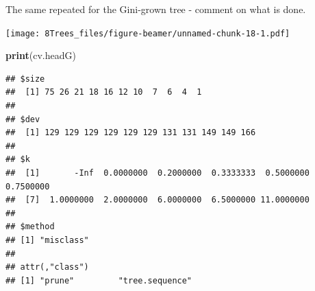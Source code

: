 \documentclass[10pt,ignorenonframetext,]{beamer}
\newenvironment{Shaded}{\begin{snugshade}}{\end{snugshade}}
\newcommand{\KeywordTok}[1]{\textcolor[rgb]{0.13,0.29,0.53}{\textbf{#1}}}
\newcommand{\DataTypeTok}[1]{\textcolor[rgb]{0.13,0.29,0.53}{#1}}
\newcommand{\DecValTok}[1]{\textcolor[rgb]{0.00,0.00,0.81}{#1}}
\newcommand{\StringTok}[1]{\textcolor[rgb]{0.31,0.60,0.02}{#1}}
\newcommand{\OperatorTok}[1]{\textcolor[rgb]{0.81,0.36,0.00}{\textbf{#1}}}
\newcommand{\NormalTok}[1]{#1}
\begin{document}
\begin{frame}[fragile]

The same repeated for the Gini-grown tree - comment on what is done.

\begin{Shaded}
\end{Shaded}

\texttt{[image: 8Trees\_files/figure-beamer/unnamed-chunk-18-1.pdf]}

\end{frame}

\begin{frame}[fragile]

\begin{Shaded}
\begin{Highlighting}[]
\KeywordTok{print}\NormalTok{(cv.headG)}
\end{Highlighting}
\end{Shaded}

\begin{verbatim}
## $size
##  [1] 75 26 21 18 16 12 10  7  6  4  1
## 
## $dev
##  [1] 129 129 129 129 129 129 131 131 149 149 166
## 
## $k
##  [1]       -Inf  0.0000000  0.2000000  0.3333333  0.5000000  0.7500000
##  [7]  1.0000000  2.0000000  6.0000000  6.5000000 11.0000000
## 
## $method
## [1] "misclass"
## 
## attr(,"class")
## [1] "prune"         "tree.sequence"
\end{verbatim}

\end{frame}
\end{document}
